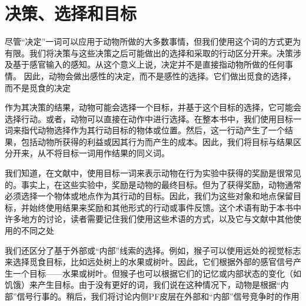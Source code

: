 \section{决策、选择和目标}
尽管“决定”一词可以应用于动物所做的大多数事情，但我们使用这个词的方式更为有限。我们将决策与这些决策之后可能做出的选择和采取的行动区分开来\cite{Schall 2001}。决策涉及基于感官输入的感知。从这个意义上说，决定并不是直接指动物所做的任何事情。
因此，动物会做出感性的决定，而不是感性的选择。它们做出觅食的选择，而不是觅食的决定\par
作为其决策的结果，动物可能会选择一个目标，并基于这个目标的选择，它可能会选择行动。或者，动物可以直接在动作中进行选择。在整本书中，我们使用目标一词来指代动物选择作为其行动目标的物体或位置。然后，这一行动产生了一个结果，包括动物所获得的利益或因其行为而产生的成本。因此，我们将目标与结果区分开来，从不将目标一词用作结果的同义词。\par
我们知道，在文献中，使用目标一词来表示动物在行为实验中获得的奖励是很常见的。事实上，在这些实验中，奖励是动物的最终目标。但为了获得奖励，动物通常必须选择一个物体或地点作为其行动的目标。因此，我们为这些对象和地点保留目标，并始终使用结果来奖励和其他形式的行动或事件反馈。这个术语有助于本书中许多地方的讨论，读者需要记住我们使用这些术语的方式，以及它与文献中其他使用的不同之处\par
我们还区分了基于外部或“内部”线索的选择\cite{Passingham et al.2010}。例如，猴子可以使用远处的视觉标志来选择觅食目标，比如远处树上的水果或树叶。因此，它们根据外部的感官信号产生一个目标——水果或树叶。但猴子也可以根据它们的记忆或内部状态的变化（如饥饿）来产生目标。由于没有更好的词，我们说在这种情况下，动物是根据“内部”信号行事的。稍后，我们将讨论内侧PF皮层在外部和“内部”信号竞争时的作用\par
